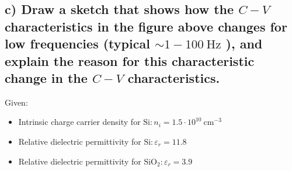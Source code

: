 \subsection*{c) Draw a sketch that shows how the $C-V$ characteristics in the figure above changes for low frequencies (typical $\sim 1-100 \mathrm{~Hz}$ ), and explain the reason for this characteristic change in the $C-V$ characteristics.}
Given:
\begin{itemize}
    \item Intrinsic charge carrier density for $\mathrm{Si}: n_i=1.5 \cdot 10^{10} \mathrm{~cm}^{-3}$
    \item Relative dielectric permittivity for $\mathrm{Si}: \varepsilon_r=11.8$
    \item Relative dielectric permittivity for $\mathrm{SiO}_2: \varepsilon_r=3.9$
\end{itemize}

